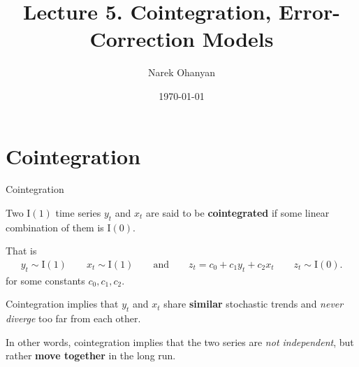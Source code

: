 \documentclass[10pt,aspectratio=169]{beamer}  %
\author[Narek Ohanyan]{Narek Ohanyan}
\title[Lecture 5. Cointegration, Error-Correction Models]{Lecture 5. Cointegration, Error-Correction Models}
\institute[AUA]{American University of Armenia}
\date{\today}
\begin{document}
\begin{frame}
    \titlepage
\end{frame}


\section{Cointegration}


\begin{frame}{Cointegration}

    \bigskip
    Two $ \mathrm{I}(1) $ time series $ y_{t} $ and $ x_{t} $ are said to be \textbf{cointegrated} if some linear combination of them is $ \mathrm{I}(0) $.

    That is
    \begin{align*}
        y_{t} \sim \mathrm{I}(1) \qquad x_{t} \sim \mathrm{I}(1) \qquad \text{and} \quad \quad z_{t} = c_0 + c_1 y_{t} + c_2 x_{t} \qquad z_{t} \sim \mathrm{I}(0).
    \end{align*}
    for some constants $ c_0, c_1, c_2 $.

    \medskip
    Cointegration implies that $ y_{t} $ and $ x_{t} $ share \textbf{similar} stochastic trends and \textit{never diverge} too far from each other.

    \medskip
    In other words, cointegration implies that the two series are \textit{not independent}, but rather \textbf{move together} in the long run.

\end{frame}

\end{document}
